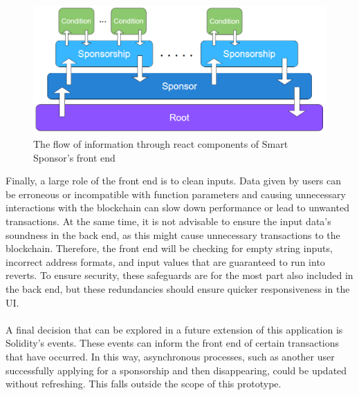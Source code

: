 \begin{figure}[H]
    \centering
    \includegraphics[scale=0.5]{figures/sponsor front end.PNG}  
    \caption{The flow of information through react components of Smart Sponsor's front end}
    \label{fig:sponsorfront}
\end{figure}
Finally, a large role of the front end is to clean inputs. Data given by users can be erroneous or incompatible with function parameters and causing unnecessary interactions with the blockchain can slow down performance or lead to unwanted transactions. At the same time, it is not advisable to ensure the input data's soundness in the back end, as this might cause unnecessary transactions to the blockchain. Therefore, the front end will be checking for empty string inputs, incorrect address formats, and input values that are guaranteed to run into reverts. To ensure security, these safeguards are for the most part also included in the back end, but these redundancies should ensure quicker responsiveness in the UI.\\
\\
A final decision that can be explored in a future extension of this application is Solidity's events. These events can inform the front end of certain transactions that have occurred. In this way, asynchronous processes, such as another user successfully applying for a sponsorship and then disappearing, could be updated without refreshing. This falls outside the scope of this prototype.
